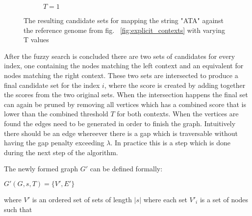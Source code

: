\documentclass{article}
\begin{document}
\begin{wrapfigure}{L}{0.5\textwidth}
\begin{subfigure}[t]{\textwidth}
\begin{mdframed}
    \end{mdframed}
    \caption{$T=1$}
  \end{subfigure}
  \caption{The resulting candidate sets for mapping the string "ATA" against the reference genome from fig. ~\ref{fig:explicit_contexts} with varying T values}
  \label{fig:candidate_nodes}
\end{wrapfigure}
After the fuzzy search is concluded there are two sets of candidates for every index, one containing the nodes matching the left context and an equivalent for nodes matching the right context. These two sets are intersected to produce a final candidate set for the index $i$, where the score is created by adding together the scores from the two original sets. When the intersection happens the final set can again be pruned by removing all vertices which has a combined score that is lower than the combined threshold $T$ for both contexts. When the vertices are found the edges need to be generated in order to finish the graph. Intuitively there should be an edge whereever there is a gap which is traversable without having the gap penalty exceeding $\lambda$. In practice this is a step which is done during the next step of the algorithm.\\
\par\noindent
The newly formed graph $G'$ can be defined formally:\\
\par
$G'(G, s, T) = \{V', E'\}$\\
\par\noindent
where $V'$ is an ordered set of sets of length $|s|$ where each set $V'_i$ is a set of nodes such that\\
\end{document}
